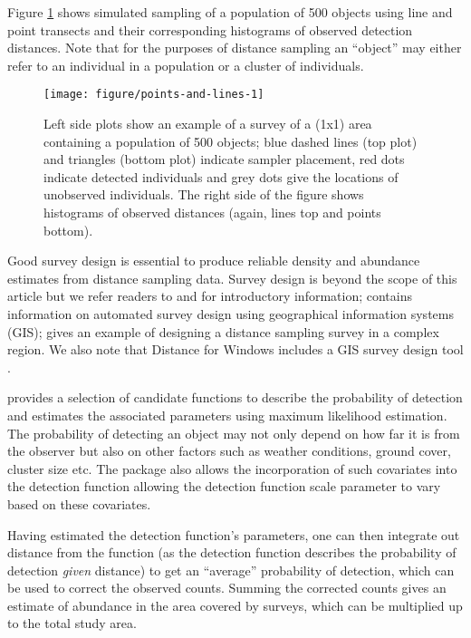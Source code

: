 \documentclass[article]{jss}\usepackage[]{graphicx}\usepackage[]{color}
\makeatletter
\def\maxwidth{ %
  \ifdim\Gin@nat@width>\linewidth
    \linewidth
  \else
    \Gin@nat@width
  \fi
}
\makeatother
\begin{document}
Figure \ref{fig:pointslines} shows simulated sampling of a population of 500 objects using line and point transects and their corresponding histograms of observed detection distances. Note that for the purposes of distance sampling an ``object'' may either refer to an individual in a population or a cluster of individuals.  

\begin{figure}
\begin{center}
\begin{Schunk}

\texttt{[image: figure/points-and-lines-1]} \end{Schunk}
\caption{Left side plots show an example of a survey of a (1x1) area containing a population of 500 objects; blue dashed lines (top plot) and triangles (bottom plot) indicate sampler placement, red dots indicate detected individuals and grey dots give the locations of unobserved individuals. The right side of the figure shows histograms of observed distances (again, lines top and points bottom).}
\label{fig:pointslines}
\end{center}
\end{figure}


Good survey design is essential to produce reliable density and abundance estimates from distance sampling data. Survey design is beyond the scope of this article but we refer readers to \cite[][Chapter 7]{Buckland:2001vm} and \cite[][Chapter 2]{buckland2015distance} for introductory information; \cite{Strindberg:2004vr} contains information on automated survey design using geographical information systems (GIS); \cite{Thomas:2007wz} gives an example of designing a distance sampling survey in a complex region. We also note that Distance for Windows includes a GIS survey design tool \citep{Thomas:2010cf}.

 provides a selection of candidate functions to describe the probability of detection and estimates the associated parameters using maximum likelihood estimation. The probability of detecting an object may not only depend on how far it is from the observer but also on other factors such as weather conditions, ground cover, cluster size etc. The  package also allows the incorporation of such covariates into the detection function allowing the detection function scale parameter to vary based on these covariates.

Having estimated the detection function's parameters, one can then integrate out distance from the function (as the detection function describes the probability of detection \textit{given} distance) to get an ``average'' probability of detection, which can be used to correct the observed counts. Summing the corrected counts gives an estimate of abundance in the area covered by surveys, which can be multiplied up to the total study area.
\end{document}

